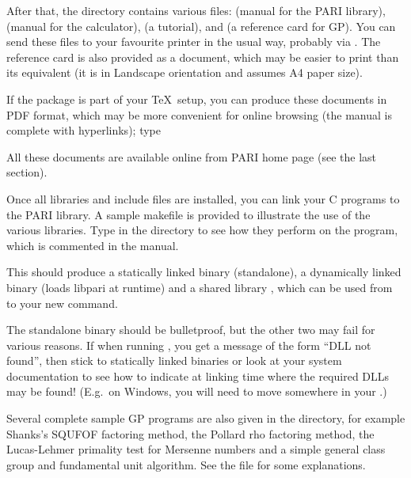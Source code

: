 After that, the  directory contains various  files:
 (manual for the PARI library),  (manual
for the  calculator),  (a tutorial), and
 (a reference card for GP). You can send these files to your
favourite printer in the usual way, probably via . The reference
card is also provided as a  document, which may be easier to
print than its  equivalent (it is in Landscape orientation and
assumes A4 paper size).

\noindent If the  package is part of your \TeX\ setup, you can
produce these documents in PDF format, which may be more convenient for
online browsing (the manual is complete with hyperlinks); type


\noindent All these documents are available online from PARI home page
(see the last section).

 Once all libraries and include files are installed,
you can link your C programs to the PARI library. A sample makefile
 is provided to illustrate the use of the various
libraries. Type  in the  directory to see how
they perform on the  program, which is commented in the
manual. 

This should produce a statically linked binary 
(standalone), a dynamically linked binary  (loads libpari
at runtime) and a shared library , which can be used from
 to  your new  command.

The standalone binary should be bulletproof, but the other two may fail
for various reasons. If when running , you get a message
of the form ``DLL not found'', then stick to statically linked binaries
or look at your system documentation to see how to indicate at linking
time where the required DLLs may be found! (E.g.~on Windows, you will
need to move  somewhere in your .)

 Several complete sample GP programs are also given in
the  directory, for example Shanks's SQUFOF factoring method,
the Pollard rho factoring method, the Lucas-Lehmer primality test for
Mersenne numbers and a simple general class group and fundamental unit
algorithm. See the file  for some explanations.

